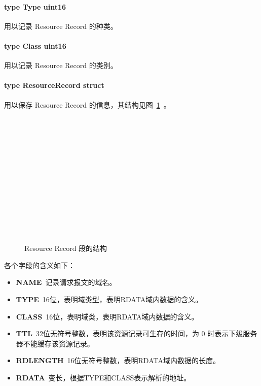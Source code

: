 \documentclass[blue,normal,cn]{elegantnote}
\begin{document}
\paragraph{type Type uint16} 用以记录 Resource Record 的种类。

\paragraph{type Class uint16} 用以记录 Resource Record 的类别。

\paragraph{type ResourceRecord struct} 用以保存 Resource Record 的信息，其结构见图~\ref{dns_rr}~。
\begin{figure}[!htbp]
	\centering
	\begin{bytefield}[bitwidth=2em]{16}
		 \\
		 \\
		\skippedwords \\
		 \\
		 \\
		 \\
		 \\
		 \\
		 \\
		 \\
		\skippedwords \\
		 \\
	\end{bytefield}
	\caption{\label{dns_rr} Resource Record 段的结构}
\end{figure}
各个字段的含义如下：
\begin{itemize}
	\item \textbf{NAME}\ 记录请求报文的域名。
	\item \textbf{TYPE}\ 16位，表明域类型，表明RDATA域内数据的含义。
	\item \textbf{CLASS}\ 16位，表明域类，表明RDATA域内数据的含义。
	\item \textbf{TTL}\ 32位无符号整数，表明该资源记录可生存的时间，为 0 时表示下级服务器不能缓存该资源记录。
	\item \textbf{RDLENGTH}\ 16位无符号整数，表明RDATA域内数据的长度。
	\item \textbf{RDATA}\ 变长，根据TYPE和CLASS表示解析的地址。
\end{itemize}
\end{document}
